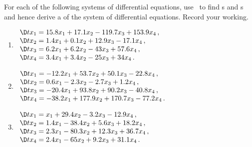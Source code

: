 \begin{exercise}  
For each of the following systems of differential equations, use \script\ to find s and s and hence derive a  of the system of differential equations.  
Record your working.

\begin{enumerate}
\item \(\begin{array}{l} 
\D t{x_1}= 15.8x_1 +17.1x_2 -119.7x_3 +153.9x_4\,,\\
\D t{x_2}= 1.4x_1 +0.1x_2 +12.9x_3 -17.1x_4\,,\\
\D t{x_3}= 6.2x_1 +6.2x_2 -43x_3 +57.6x_4\,,\\
\D t{x_4}= 3.4x_1 +3.4x_2 -25x_3 +34x_4\,.
\end{array}\)
\setbox\ajrqrbox\hbox{}\marginajrbox%

\item \(\begin{array}{l} 
\D t{x_1}= -12.2x_1 +53.7x_2 +50.1x_3 -22.8x_4\,,\\
\D t{x_2}= 0.6x_1 -2.3x_2 -2.7x_3 +1.2x_4\,,\\
\D t{x_3}= -20.4x_1 +93.8x_2 +90.2x_3 -40.8x_4\,,\\
\D t{x_4}= -38.2x_1 +177.9x_2 +170.7x_3 -77.2x_4\,.
\end{array}\)
\setbox\ajrqrbox\hbox{}\marginajrbox%

\item \(\begin{array}{l} 
\D t{x_1}= x_1 +29.4x_2 -3.2x_3 -12.9x_4\,,\\
\D t{x_2}= 1.4x_1 -38.4x_2 +5.6x_3 +18.2x_4\,,\\
\D t{x_3}= 2.3x_1 -80.3x_2 +12.3x_3 +36.7x_4\,,\\
\D t{x_4}= 2.4x_1 -65x_2 +9.2x_3 +31.1x_4\,.
\end{array}\)
\setbox\ajrqrbox\hbox{}\marginajrbox%


\end{enumerate}
\end{exercise}
